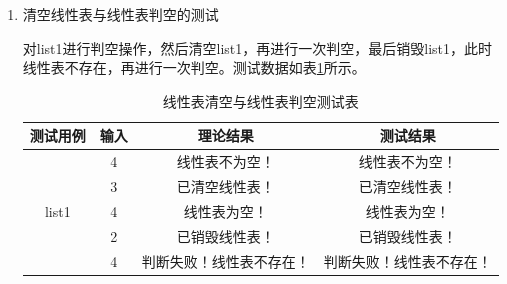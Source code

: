 \documentclass[supercite]{Experimental_Report}
\theoremstyle{definition}
\begin{document}
\newpage

\begin{enumerate}
	\item 清空线性表与线性表判空的测试

	对list1进行判空操作，然后清空list1，再进行一次判空，最后销毁list1，此时线性表不存在，再进行一次判空。测试数据如表\ref{table1}所示。
	\begin{table}
		\begin{center}
		\setlength{\tabcolsep}{1.8mm}
		\caption{线性表清空与线性表判空测试表}
		\label{table1}
			\begin{tabular}{c|c|c|c}
			\hline
			测试用例    			     & 输入               & 理论结果         & 测试结果\\
			\hline
			\hline			
			\multirow{5}{*}{list1}   	& 4              	 & 线性表不为空！   & 线性表不为空！\\
										& 3              	 & 已清空线性表！   & 已清空线性表！\\
										& 4			         & 线性表为空！   	& 线性表为空！\\
										& 2				     & 已销毁线性表！   & 已销毁线性表！\\
										& 4				     & 判断失败！线性表不存在！   & 判断失败！线性表不存在！\\
			\hline
			\end{tabular}
		\end{center}
	\end{table}


\end{enumerate}
\end{document}
